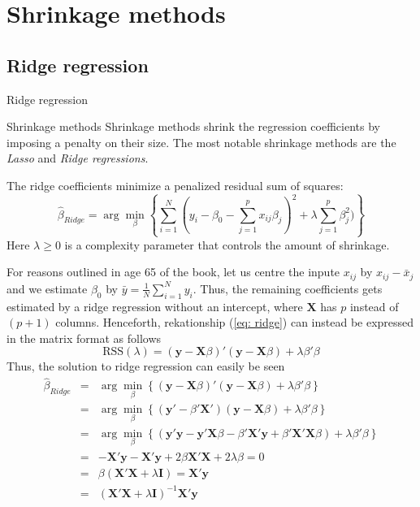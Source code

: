 \documentclass{beamer}
\newcommand{\X}{\bm{X}}
\newcommand{\y}{\bm{y}}
\begin{document}
\section{Shrinkage methods}
\subsection{Ridge regression}
\begin{frame}{Ridge regression}
\begin{block}{Shrinkage methods}
Shrinkage methods shrink the regression coefficients by imposing a penalty on their size. The most notable shrinkage methods are the \textit{Lasso} and \textit{Ridge regressions}.
\end{block}
The ridge coefficients minimize a penalized residual sum of squares:
\begin{equation}\label{eq: ridge}
\hat{\beta}_{Ridge}=\arg\min_{\beta}\left\{\sum\limits_{i=1}^{N}(y_i-\beta_0-\sum\limits_{j=1}^{p}x_{ij}\beta_j)^2+\lambda\sum\limits_{j=1}^{p}\beta_j^2)\right\}
\end{equation}
Here $\lambda\geq0$ is a complexity parameter that controls the amount of shrinkage.
\end{frame}
\begin{frame}
For reasons outlined in age 65 of the book, let us centre the inpute $x_{ij}$ by $x_{ij}-\bar{x}_j$ and we estimate $\beta_0$ by $\bar{y}=\frac{1}{N}\sum\limits_{i=1}^{N}y_i$. Thus, the remaining coefficients gets estimated by a ridge regression without an intercept, where $\X$ has $p$ instead of $(p+1)$ columns. Henceforth, rekationship (\ref{eq: ridge}) can instead be expressed in the matrix format as follows
\[
\text{RSS}(\lambda)=(\y-\X\beta)'(\y-\X\beta)+\lambda\beta'\beta
\]
Thus, the solution to ridge regression can easily be seen
\begin{eqnarray*}
\hat{\beta}_{Ridge}&=&\arg\min_{\beta}\left\{(\y-\X\beta)'(\y-\X\beta)+\lambda\beta'\beta\right\}\\
&=&\arg\min_{\beta}\left\{(\y'-\beta'\X')(\y-\X\beta)+\lambda\beta'\beta\right\}\\
&=&\arg\min_{\beta}\left\{(\y'\y-\y'\X\beta-\beta'\X'\y+\beta'\X'\X\beta)+\lambda\beta'\beta\right\}\\
&=&-\X'\y-\X'\y+2\beta\X'\X+2\lambda\beta=0\\
&=&\beta(\X'\X+\lambda\bm{I})=\X'\y\\
&=&(\X'\X+\lambda\bm{I})^{-1}\X'\y
\end{eqnarray*}
\end{frame}
\end{document}
